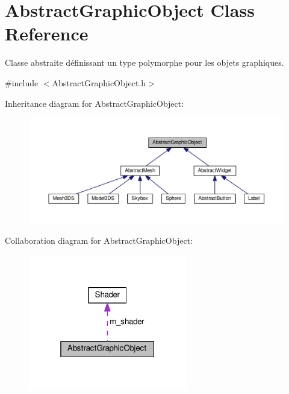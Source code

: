 \hypertarget{classAbstractGraphicObject}{\section{Abstract\+Graphic\+Object Class Reference}
\label{classAbstractGraphicObject}
}


Classe abstraite définissant un type polymorphe pour les objets graphiques.  




{\ttfamily \#include $<$Abstract\+Graphic\+Object.\+h$>$}



Inheritance diagram for Abstract\+Graphic\+Object\+:
\nopagebreak
\begin{figure}[H]
\begin{center}
\leavevmode
\includegraphics[width=350pt]{classAbstractGraphicObject__inherit__graph}
\end{center}
\end{figure}


Collaboration diagram for Abstract\+Graphic\+Object\+:\nopagebreak
\begin{figure}[H]
\begin{center}
\leavevmode
\includegraphics[width=196pt]{classAbstractGraphicObject__coll__graph}
\end{center}
\end{figure}

